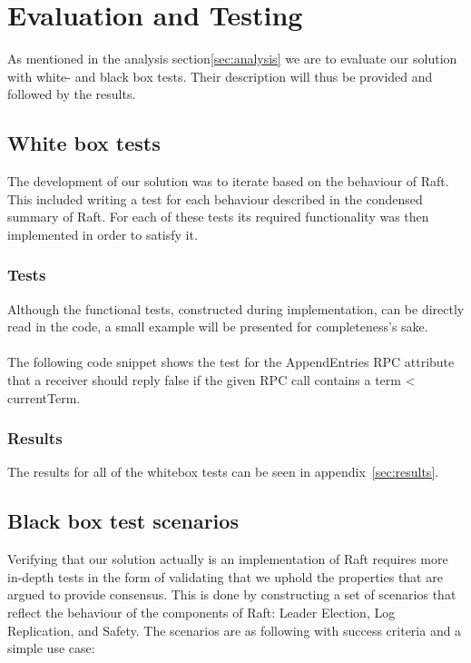 \section{Evaluation and Testing} %
\label{sec:evaluation_and_testing}
As mentioned in the analysis section\ref{sec:analysis} we are to evaluate our solution with white- and black box tests. Their description will thus be provided and followed by the results.

\subsection{White box tests}
The development of our solution was to iterate based on the behaviour of Raft. This included writing a test for each behaviour described in the condensed summary of Raft\cite{Raft}. For each of these tests its required functionality was then implemented in order to satisfy it.


\subsubsection{Tests}
Although the functional tests, constructed during implementation, can be directly read in the code, a small example will be presented for completeness's sake.\\ \\
The following code snippet shows the test for the AppendEntries RPC attribute that a receiver should reply false if the given RPC call contains a term < currentTerm.


\subsubsection{Results}
The results for all of the whitebox tests can be seen in appendix~\ref{sec:results}.

\subsection{Black box test scenarios}
Verifying that our solution actually is an implementation of Raft requires more in-depth tests in the form of validating that we uphold the properties that are argued to provide consensus. This is done by constructing a set of scenarios that reflect the behaviour of the components of Raft: Leader Election, Log Replication, and Safety. The scenarios are as following with success criteria and a simple use case:

